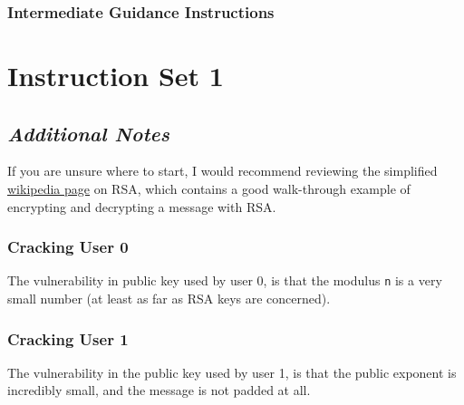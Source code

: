         \newpage



        \subsubsection{Intermediate Guidance Instructions}



            {\parindent0pt\singlespacing



                \section*{Instruction Set 1}



                    \subsection*{\textit{Additional Notes}}



                        If you are unsure where to start, I would recommend reviewing the simplified \href{https://simple.wikipedia.org/wiki/RSA_algorithm}{wikipedia page} on RSA, which contains a good walk-through example of encrypting and decrypting a message with RSA.







                        \subsubsection*{Cracking User 0}



                            The vulnerability in public key used by user 0, is that the modulus \lstinline`n` is a very small number (at least as far as RSA keys are concerned).



                        \subsubsection*{Cracking User 1}



                            The vulnerability in the public key used by user 1, is that the public exponent is incredibly small, and the message is not padded at all. 



}
